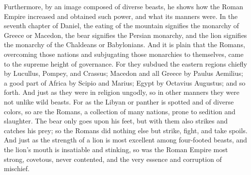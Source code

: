 Furthermore, by an image composed of diverse beasts, he shows how the Roman Empire increased and obtained such power, and what its manners were. In the seventh chapter of Daniel, the eating of the mountain signifies the monarchy of Greece or Macedon, the bear signifies the Persian monarchy, and the lion signifies the monarchy of the Chaldeans or Babylonians. And it is plain that the Romans, overcoming those nations and subjugating those monarchies to themselves, came to the supreme height of governance. For they subdued the eastern regions chiefly by Lucullus, Pompey, and Crassus; Macedon and all Greece by Paulus Aemilius; a good part of Africa by Scipio and Marius; Egypt by Octavius Augustus; and so forth. And just as they were in religion ungodly, so in other manners they were not unlike wild beasts. For as the Libyan or panther is spotted and of diverse colors, so are the Romans, a collection of many nations, prone to sedition and slaughter. The bear only goes upon his feet, but with them also strikes and catches his prey; so the Romans did nothing else but strike, fight, and take spoils. And just as the strength of a lion is most excellent among four-footed beasts, and the lion’s mouth is insatiable and stinking, so was the Roman Empire most strong, covetous, never contented, and the very essence and corruption of mischief.


